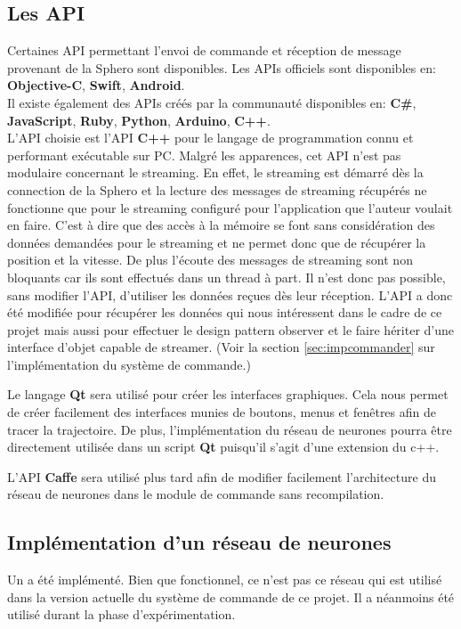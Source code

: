 \documentclass[12pt,a4paper,oneside, titlepage]{article}
\begin{document}
\subsection{Les API}
Certaines API permettant l'envoi de commande et réception de message provenant de la Sphero sont disponibles.
Les APIs officiels sont disponibles en: \textbf{Objective-C}, \textbf{Swift}, \textbf{Android}.\cite{SDKofficiels}\\
Il existe également des APIs créés par la communauté disponibles en\cite{gosphero}: \textbf{C\#}, \textbf{JavaScript}, \textbf{Ruby}, \textbf{Python}\cite{pythonAPI}, \textbf{Arduino}, \textbf{C++}\cite{cppAPI}.\\
L'API choisie est l'API \textbf{C++} pour le langage de programmation connu et performant exécutable sur PC.
Malgré les apparences, cet API n'est pas modulaire concernant le streaming.
En effet, le streaming est démarré dès la connection de la Sphero et la lecture des messages de streaming récupérés ne fonctionne que pour le streaming configuré pour l'application que l'auteur voulait en faire.
C'est à dire que des accès à la mémoire se font sans considération des données demandées pour le streaming et ne permet donc que de récupérer la position et la vitesse.
De plus l'écoute des messages de streaming sont non bloquants car ils sont effectués dans un thread à part.
Il n'est donc pas possible, sans modifier l'API, d'utiliser les données reçues dès leur réception.
L'API a donc été modifiée pour récupérer les données qui nous intéressent dans le cadre de ce projet mais aussi pour effectuer le design pattern observer  et le faire hériter d'une interface d'objet capable de streamer.
(Voir la section \ref{sec:impcommander} sur l'implémentation du système de commande.)

Le langage \textbf{Qt} sera utilisé pour créer les interfaces graphiques.
Cela nous permet de créer facilement des interfaces munies de boutons, menus et fenêtres afin de tracer la trajectoire.
De plus, l'implémentation du réseau de neurones pourra être directement utilisée dans un script \textbf{Qt} puisqu'il s'agit d'une extension du c++.

L'API \textbf{Caffe} sera utilisé plus tard afin de modifier facilement l'architecture du réseau de neurones dans le module de commande sans recompilation.\cite{caffe}

\subsection{Implémentation d'un réseau de neurones}
Un \rbf a été implémenté. Bien que fonctionnel, ce n'est pas ce réseau qui est utilisé dans la version actuelle du système de commande de ce projet.
Il a néanmoins été utilisé durant la phase d'expérimentation.
\end{document}
